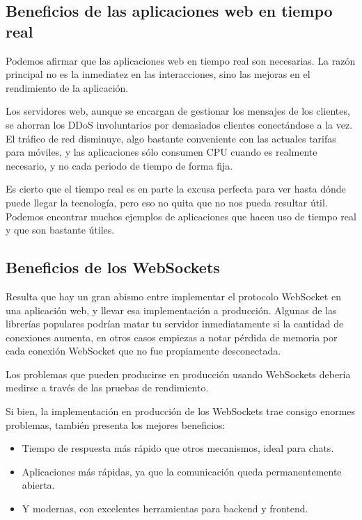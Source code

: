 \subsection{Beneficios de las aplicaciones web en tiempo real}

Podemos afirmar que las aplicaciones web en tiempo real son necesarias. La razón principal no es la inmediatez en las interacciones, sino las mejoras en el rendimiento de la aplicación.

Los servidores web, aunque se encargan de gestionar los mensajes de los clientes, se ahorran los DDoS involuntarios por demasiados clientes conectándose a la vez. El tráfico de red disminuye, algo bastante conveniente con las actuales tarifas para móviles, y las aplicaciones sólo consumen CPU cuando es realmente necesario, y no cada periodo de tiempo de forma fija.

Es cierto que el tiempo real es en parte la excusa perfecta para ver hasta dónde puede llegar la tecnología, pero eso no quita que no nos pueda resultar útil. Podemos encontrar muchos ejemplos de aplicaciones que hacen uso de tiempo real y que son bastante útiles.

\subsection{Beneficios de los WebSockets}

Resulta que hay un gran abismo entre implementar el protocolo WebSocket en una aplicación web, y llevar esa implementación a producción. Algunas de las librerías populares podrían matar tu servidor inmediatamente si la cantidad de conexiones aumenta, en otros casos empiezas a notar pérdida de memoria por cada conexión WebSocket que no fue propiamente desconectada.

Los problemas que pueden producirse en producción usando WebSockets debería medirse a través de las pruebas de rendimiento.

Si bien, la implementación en producción de los WebSockets trae consigo enormes problemas, también presenta los mejores beneficios:

\begin{itemize}
  \item Tiempo de respuesta más rápido que otros mecanismos, ideal para chats.
  \item Aplicaciones más rápidas, ya que la comunicación queda permanentemente abierta.
  \item Y modernas, con excelentes herramientas para backend y frontend.
\end{itemize}

